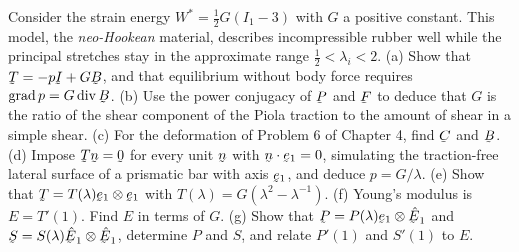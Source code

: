\begin{problem}
Consider the strain energy $W^{*}=\tfrac12 G(I_{1}-3)$ with $G$ a
positive constant. This model, the \emph{neo-Hookean} material,
describes incompressible rubber well while the principal stretches stay
in the approximate range $\tfrac12<\lambda_{i}<2$.
\textup{(a)} Show that $\bT=-p\I+G\bB$, and that equilibrium without
body force requires $\grad p=G\dvg\bB$.
\textup{(b)} Use the power conjugacy of $\bP$ and $\bF$ to deduce that
$G$ is the ratio of the shear component of the Piola traction to the
amount of shear in a simple shear.
\textup{(c)} For the deformation of Problem 6 of Chapter 4, find $\bC$
and $\bB$.
\textup{(d)} Impose $\bT\bn=\bze$ for every unit $\bn$ with
$\ip\bn{\be_{1}}=0$, simulating the traction-free lateral surface of a
prismatic bar with axis $\be_{1}$, and deduce $p=G/\lambda$.
\textup{(e)} Show that $\bT=T(\lambda)\be_{1}\otimes\be_{1}$ with
$T(\lambda)=G(\lambda^{2}-\lambda^{-1})$.
\textup{(f)} Young's modulus is $E=T'(1)$. Find $E$ in terms of $G$.
\textup{(g)} Show that $\bP=P(\lambda)\be_{1}\otimes\hbE_{1}$ and
$\bS=S(\lambda)\hbE_{1}\otimes\hbE_{1}$, determine $P$ and $S$, and
relate $P'(1)$ and $S'(1)$ to $E$.
\end{problem}

